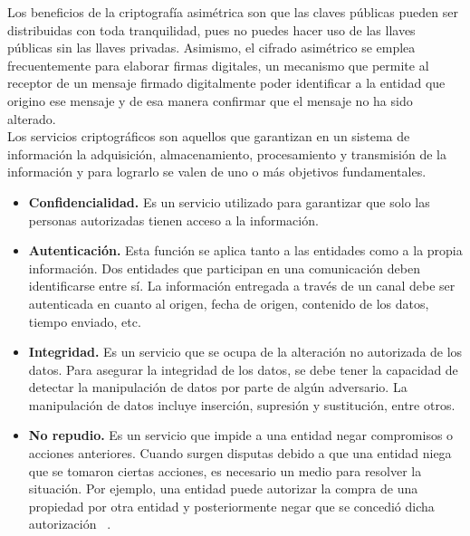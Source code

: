 Los beneficios de la criptografía asimétrica son que las claves públicas pueden ser distribuidas con toda tranquilidad, pues no puedes hacer uso de las llaves públicas sin las llaves privadas. Asimismo, el cifrado asimétrico se emplea  frecuentemente para elaborar firmas digitales, un mecanismo que permite al receptor de un mensaje firmado digitalmente poder identificar a la entidad que origino ese mensaje y de esa manera confirmar que el mensaje no ha sido alterado. \\



Los servicios criptográficos son aquellos que garantizan en un sistema de información la adquisición, almacenamiento, procesamiento y transmisión de la información y para lograrlo se valen de uno o más objetivos fundamentales. 
 \begin{itemize}
	\item \textbf{Confidencialidad. }
Es un servicio utilizado para garantizar que solo las personas autorizadas tienen acceso a la información.

	\item \textbf{Autenticación. }
Esta función se aplica tanto a las entidades como a la propia información. Dos entidades que participan en una comunicación deben identificarse entre sí. La información entregada a través de un canal debe ser autenticada en cuanto al origen, fecha de origen, contenido de los datos, tiempo enviado, etc. 

	\item \textbf{Integridad. }
Es un servicio que se ocupa de la alteración no autorizada de los datos. Para asegurar la integridad de los datos, se debe tener la capacidad de detectar la manipulación de datos por parte de algún adversario. La manipulación de datos incluye inserción, supresión y sustitución, entre otros.

	\item \textbf{No repudio. }
Es un servicio que impide a una entidad negar compromisos o acciones anteriores. Cuando surgen disputas debido a que una entidad niega que se tomaron ciertas acciones, es necesario un medio para resolver la situación. Por ejemplo, una entidad puede autorizar la compra de una propiedad por otra entidad y posteriormente negar que se concedió dicha autorización ~\cite{menezes}.
 \end{itemize}


